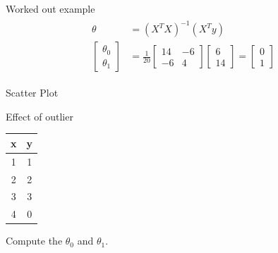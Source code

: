 \documentclass{beamer}
\begin{document}
\begin{frame}{Worked out example}
    \begin{align}
        \begin{split}
            \theta &= (X^{T}X)^{-1}(X^{T}y)\\
           \begin{bmatrix}
        \theta_{0}\\
        \theta_{1}
    \end{bmatrix} &= \frac{1}{20} \begin{bmatrix}
    14 & -6\\
    -6& 4
    \end{bmatrix}\begin{bmatrix}
    6\\
    14
    \end{bmatrix} =
    \begin{bmatrix}
        0\\
        1
    \end{bmatrix} 
        \end{split}
    \end{align}
\end{frame}

\begin{frame}{Scatter Plot}


\end{frame}



\begin{frame}{Effect of outlier}

    \begin{center}
 \begin{tabular}{||c c||} 
 \hline
 x  & y \\ [0.5ex] 
 \hline\hline
 1 & 1 \\
 2 & 2 \\
 3 & 3 \\
 4 & 0 \\
 \hline
\end{tabular}
\end{center}

Compute the $\theta_{0}$ and $\theta_{1}$.
\end{frame}
\end{document}
